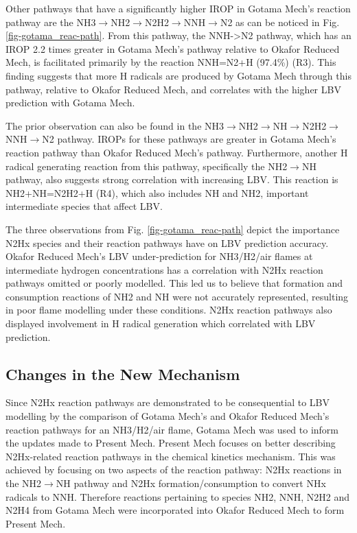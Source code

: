 \documentclass[10pt,twocolumn]{icfd2026paper}
\begin{document}
Other pathways that have a significantly higher IROP in Gotama Mech's reaction pathway are the
NH3$\rightarrow$NH2$\rightarrow$N2H2$\rightarrow$NNH$\rightarrow$N2 as can be noticed in Fig.
\ref{fig-gotama_reac-path}. From this pathway, the NNH->N2 pathway, which has an IROP 2.2 times greater in Gotama Mech's
pathway relative to Okafor Reduced Mech, is facilitated primarily by the reaction NNH=N2+H (97.4\%) (R3). This finding
suggests that more H radicals are produced by Gotama Mech through this pathway, relative to Okafor Reduced Mech, and
correlates with the higher LBV prediction with Gotama Mech. 

The prior observation can also be found in the
NH3$\rightarrow$NH2$\rightarrow$NH$\rightarrow$N2H2$\rightarrow$NNH$\rightarrow$N2 pathway. IROPs for these pathways are
greater in Gotama Mech's reaction pathway than Okafor Reduced Mech's pathway. Furthermore, another H radical generating
reaction from this pathway, specifically the NH2$\rightarrow$NH pathway, also suggests strong correlation with
increasing LBV. This reaction is NH2+NH=N2H2+H (R4), which also includes NH and NH2, important intermediate species that
affect LBV.

The three observations from Fig. \ref{fig-gotama_reac-path} depict the importance N2Hx species and their reaction
pathways have on LBV prediction accuracy. Okafor Reduced Mech's LBV under-prediction for NH3/H2/air flames at
intermediate hydrogen concentrations has a correlation with N2Hx reaction pathways omitted or poorly modelled. This led
us to believe that formation and consumption reactions of NH2 and NH were not accurately represented, resulting in poor
flame modelling under these conditions. N2Hx reaction pathways also displayed involvement in H radical generation which
correlated with LBV prediction.

\subsection{Changes in the New Mechanism}

Since N2Hx reaction pathways are demonstrated to be consequential to LBV modelling by the comparison of Gotama
Mech's and Okafor Reduced Mech's reaction pathways for an NH3/H2/air flame, Gotama Mech was used to inform the updates
made to Present Mech. Present Mech focuses on better describing N2Hx-related reaction pathways in the chemical kinetics
mechanism. This was achieved by focusing on two aspects of the reaction pathway: N2Hx reactions in the
NH2$\rightarrow$NH pathway and N2Hx formation/consumption to convert NHx radicals to NNH. Therefore reactions pertaining
to species NH2, NNH, N2H2 and N2H4 from Gotama Mech were incorporated into Okafor Reduced Mech to form Present Mech.
\end{document}
